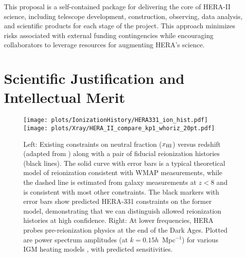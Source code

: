 \documentclass[preprint]{aastex}
\newcommand{\Mycitep}[1]{{\bf \citep{#1}}}
\newcommand{\Mycitealt}[1]{{\bf \citealt{#1}}}
\newcommand{\compress}{\vspace{-0.25in}}
\newcommand{\Caption}[4]{\vspace{#1}\renewcommand{\baselinestretch}{#2}\caption{#4}\vspace{#3}}
\def\HI{{H{\small I }}}
\def\xHI{{x_{\rm\HI}}}
\begin{document}
\noindent
This proposal is a self-contained package for delivering the core of HERA-II science,
including telescope development, construction, observing, data analysis,
and scientific products for each stage of the project.  
This approach minimizes
risks associated with external funding contingencies while encouraging
collaborators to leverage resources for augmenting HERA's science.





\compress
\section{Scientific Justification and Intellectual Merit} %

\begin{figure}[t]\centering
\texttt{[image: plots/IonizationHistory/HERA331\_ion\_hist.pdf]}
\texttt{[image: plots/Xray/HERA\_II\_compare\_kp1\_whoriz\_20pt.pdf]}
\Caption{-0.1in}{0.99}{-0.1in}{\small
Left: 
Existing constraints on neutral fraction ($\xHI$) versus redshift (adapted from \Mycitealt{robertson_2013}) along with a pair of fiducial reionization histories (black lines). The solid curve with error bars is a typical theoretical model of reionization consistent with WMAP measurements, while the dashed line is estimated from galaxy measurements at $z < 8$ and is consistent with most other constraints. The black markers with error bars show
predicted HERA-331 constraints on the former model, demonstrating that we can distinguish allowed reionization histories at high confidence.
Right: At lower frequencies, HERA probes
pre-reionization physics at the end of the Dark Ages. Plotted are power spectrum amplitudes (at $k =
0.15h$~Mpc$^{-1}$) for various IGM heating models \Mycitep{mesinger_et_al2013},
with predicted sensitivities.
}\label{fig:x_i_vs_z} \end{figure}


\end{document}
